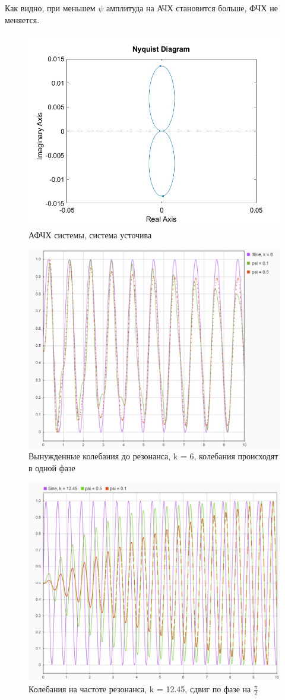 \documentclass{article}
\begin{document}
	Как видно, при меньшем $\psi$ амплитуда на АЧХ становится больше, ФЧХ не меняется.
	\begin{figure}[H]
		\centering
		\includegraphics[width=0.7\linewidth]{graph7}
		\caption{АФЧХ системы, система усточива}
		\label{fig:graph7}
	\end{figure}
	\begin{figure}[H]
		\centering
		\includegraphics[width=0.7\linewidth]{signal1}
		\caption{Вынужденные колебания до резонанса, k = 6, колебания происходят в одной фазе}
		\label{fig:signal1}
	\end{figure}
	\begin{figure}[H]
		\centering
		\includegraphics[width=0.7\linewidth]{signal2}
		\caption{Колебания на частоте резонанса, k = 12.45, сдвиг по фазе на $\frac{\pi}{2}$}
		\label{fig:signal2}
	\end{figure}
\end{document}
